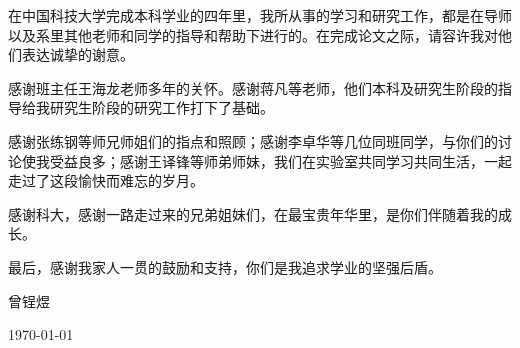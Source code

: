 ﻿
\begin{thanks}

在中国科技大学完成本科学业的四年里，我所从事的学习和研究工作，都是在导师以及系里其他老师和同学的指导和帮助下进行的。在完成论文之际，请容许我对他们表达诚挚的谢意。

感谢班主任王海龙老师多年的关怀。感谢蒋凡等老师，他们本科及研究生阶段的指导给我研究生阶段的研究工作打下了基础。

感谢张练钢等师兄师姐们的指点和照顾；感谢李卓华等几位同班同学，与你们的讨论使我受益良多；感谢王译锋等师弟师妹，我们在实验室共同学习共同生活，一起走过了这段愉快而难忘的岁月。

感谢科大，感谢一路走过来的兄弟姐妹们，在最宝贵年华里，是你们伴随着我的成长。

最后，感谢我家人一贯的鼓励和支持，你们是我追求学业的坚强后盾。

\vskip 18pt

\begin{flushright}

曾锃煜

\today

\end{flushright}

\end{thanks}
